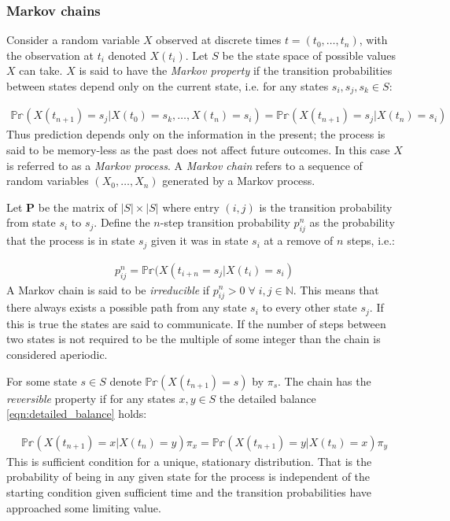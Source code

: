 \documentclass[14pt]{extarticle} %
\begin{document}
\subsubsection{Markov chains}
Consider a random variable $X$ observed at discrete times $t = (t_0,\ldots,t_n)$, with the observation at $t_i$ denoted $X(t_i)$. Let $S$ be the state space of possible values $X$ can take. $X$ is said to have the \emph{Markov property} if the transition probabilities between states depend only on the current state, i.e. for any states $s_i, s_j, s_k \in S$:

\begin{align}
\mathbb{Pr}(X(t_{n+1}) = s_j | X(t_0) = s_k, \ldots, X(t_n) = s_i) = \mathbb{Pr}(X(t_{n+1}) = s_j | X(t_n) = s_i) 
\end{align}
Thus prediction depends only on the information in the present; the process is said to be memory-less as the past does not affect future outcomes. In this case  $X$ is referred to as a \emph{Markov process}. A \emph{Markov chain} refers to a sequence of random variables $(X_0,\ldots,X_n)$ generated by a Markov process.

Let $\mathbf{P}$ be the matrix of $|S| \times |S|$ where entry $(i,j)$ is the transition probability from state $s_i$ to $s_j$. Define the $n$-step transition probability $p_{ij}^n$ as the probability that the process is in state $s_j$ given it was in state $s_i$ at a remove of $n$ steps, i.e.:

\begin{align}
p_{ij}^n = \mathbb{Pr}(X(t_{i+n} = s_j | X(t_i) = s_i)
\end{align}
A Markov chain is said to be \emph{irreducible} if $p_{ij}^n > 0 \; \forall \; i,j \in \mathbb{N}$. This means that there always exists a possible path from any state $s_i$ to every other state $s_j$. If this is true the states are said to communicate. If the number of steps between two states is not required to be the multiple of some integer than the chain is considered aperiodic.

For some state $s \in S$ denote $ \mathbb{Pr}(X(t_{n+1}) = s)$ by $\pi_s$. The chain has the \emph{reversible} property if for any states $x, y \in S$ the detailed balance \eqref{eqn:detailed_balance} holds:

\begin{align} \label{eqn:detailed_balance}
\mathbb{Pr}(X(t_{n+1}) = x | X(t_n) = y)  \pi_x  =  \mathbb{Pr}(X(t_{n+1}) = y | X(t_n) = x) \pi_y
\end{align}
This is sufficient condition for a unique, stationary distribution. That is the probability of being in any given state for the process is independent of the starting condition given sufficient time and the transition probabilities have approached some limiting value. 
\end{document}
